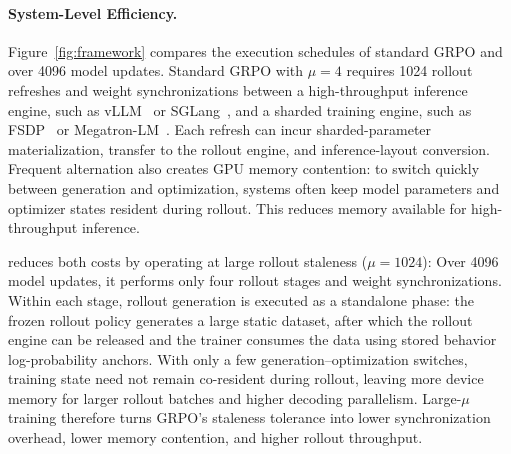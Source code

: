 \paragraph{System-Level Efficiency.}
\label{sec:method_efficiency}
Figure~\ref{fig:framework} compares the execution schedules of standard GRPO and \ourmethod{} over 4096 model updates. Standard GRPO with $\mu=4$ requires 1024 rollout refreshes and weight synchronizations between a high-throughput
inference engine, such as vLLM~\citep{kwon2023efficientmemorymanagementlarge} or
SGLang~\citep{zheng2024sglangefficientexecutionstructured}, and a sharded
training engine, such as
FSDP~\citep{zhao2023pytorchfsdpexperiencesscaling} or
Megatron-LM~\citep{DBLP:journals/corr/abs-1909-08053}. Each refresh can incur sharded-parameter materialization, transfer to the rollout engine, and inference-layout conversion. Frequent alternation also creates GPU memory contention: to switch quickly between generation and optimization, systems often keep model parameters and optimizer states resident during rollout. This reduces memory available for high-throughput inference.


\ourmethod{} reduces both costs by operating at large rollout staleness
($\mu\!=\!1024$):
Over 4096 model updates, it performs only four rollout stages and
weight synchronizations. Within each stage, rollout generation is executed as a
standalone phase: the frozen rollout policy generates a large static dataset,
after which the rollout engine can be released and the trainer consumes the data
using stored behavior log-probability anchors. With only a
few generation--optimization switches, training state need not remain co-resident
during rollout, leaving more device memory for larger rollout batches and higher decoding parallelism. Large-$\mu$
training therefore turns GRPO's staleness tolerance into lower synchronization
overhead, lower memory contention, and higher rollout throughput.
